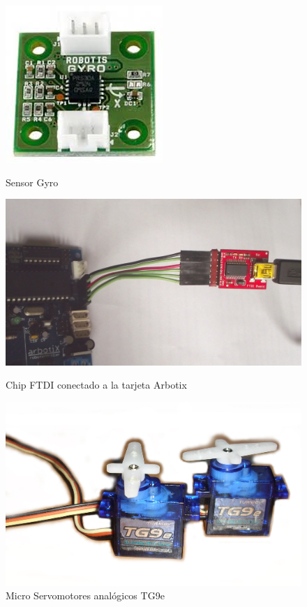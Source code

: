 \begin{figure}[hbtp]
\centering
\includegraphics[scale=0.35]{imagenes/gyro.jpg}
\caption{Sensor Gyro}
\label{fig:gyro}
\centering
\includegraphics[scale=0.06]{imagenes/DSCF1162.jpg}
\caption{Chip FTDI conectado a la tarjeta Arbotix}
\label{fig:ftdi}
\centering
\includegraphics[scale=0.09]{imagenes/servosTg9B.jpg}

\caption{Micro Servomotores analógicos TG9e}

\label{fig:Servo}
\end{figure}


